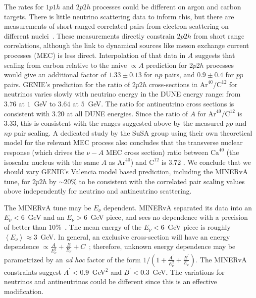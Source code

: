 The rates for $1p1h$ and $2p2h$ processes could be different on argon and carbon targets.  There is little neutrino scattering data to inform this, but there are measurements of short-ranged correlated pairs from electron scattering on different nuclei~\cite{Colle:2015ena}.  These measurements directly constrain $2p2h$ from short range correlations, although the link to dynamical sources like meson exchange current processes (MEC) is less direct. Interpolation of that data in $A$ suggests that scaling from carbon relative to the naive $\propto A$ prediction for $2p2h$ processes would give an additional factor of $1.33\pm 0.13$ for $np$ pairs, and $0.9\pm 0.4$ for $pp$ pairs.
GENIE's prediction for the ratio of $2p2h$ cross-sections in $\text{Ar}^{40}/\text{C}^{12}$ for neutrinos varies slowly with neutrino energy in the DUNE energy range: from $3.76$ at $1$~GeV to $3.64$ at $5$~GeV. The ratio for antineutrino cross sections is consistent with $3.20$ at all DUNE energies. Since the ratio of $A$ for $\text{Ar}^{40}/\text{C}^{12}$ is $3.33$, this is consistent with the ranges suggested above by the measured $pp$ and $np$ pair scaling.  A dedicated study by the SuSA group using their own theoretical model for the relevant MEC process also concludes that the transverse nuclear response (which drives the $\nu-A$ MEC cross section) ratio between $\text{Ca}^{40}$ (the isoscalar nucleus with the same $A$ as $\text{Ar}^{40}$) and $\text{C}^{12}$ is $3.72$ \cite{Amaro:2017eah}.   We conclude that we should vary GENIE's Valencia model based prediction, including the MINERvA tune, for $2p2h$ by $\sim 20\%$ to be consistent with the correlated pair scaling values above independently for neutrino and antineutrino scattering. 

The MINERvA tune may be $E_\nu$ dependent. MINERvA separated its data into an $E_\nu<6$~GeV and an $E_\nu>$6~GeV piece, and sees no dependence with a precision of better than $10\%$~\cite{Rodrigues:2015hik}.  The mean energy of the $E_\nu<6$~GeV piece is roughly $\left< E_\nu\right>\approx 3$~GeV.  In general, an exclusive cross-section will have an energy dependence $\propto \frac{A}{E_\nu^2}+\frac{B}{E_\nu}+C$~\cite{llewelyn-smith}; therefore, unknown energy dependence may be parametrized by an {\em ad hoc} factor of the form $1/\left(1+ \frac{A^{'}}{E_\nu^2 }+\frac{B^{'}}{E_\nu}\right)$.  The MINERvA constraints suggest $A^{'}<0.9$~GeV$^2$ and $B^{'}<0.3$~GeV.  The variations for neutrinos and antineutrinos could be different since this is an effective modification.


